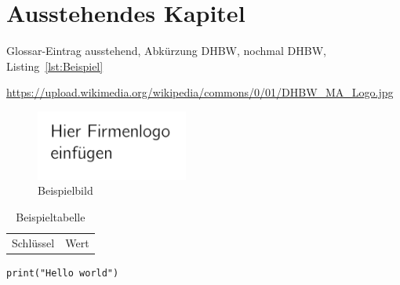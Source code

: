 \section{Ausstehendes Kapitel}

Glossar\hyp{}Eintrag \gls{ausstehend}, Abkürzung \ac{DHBW}, nochmal \ac{DHBW}, Listing~\ref{lst:Beispiel}

\begin{sloppypar}
\url{https://upload.wikimedia.org/wikipedia/commons/0/01/DHBW_MA_Logo.jpg}
\end{sloppypar}


\begin{figure}
    \caption{Beispielbild}
    \includegraphics[width=5cm]{img/logo.png}
\end{figure}

\begin{table}
    \caption{Beispieltabelle}
    \begin{tabular}{ll}
        Schlüssel&Wert
    \end{tabular}
\end{table}

\begin{lstfloat}
\begin{lstlisting}
print("Hello world")
\end{lstlisting}
\end{lstfloat}

